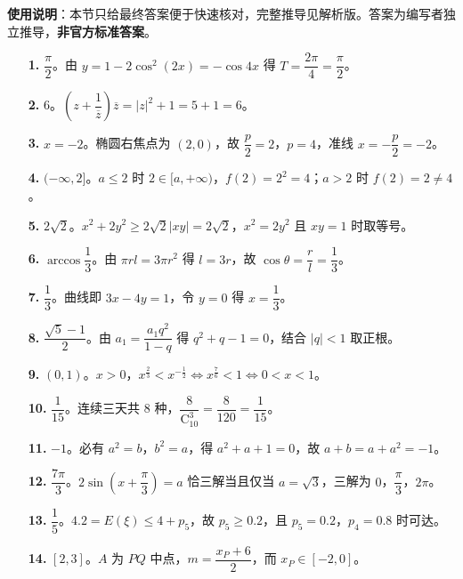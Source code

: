 
\begin{gknotice}
\textbf{使用说明}：本节只给最终答案便于快速核对，完整推导见解析版。答案为编写者独立推导，\textbf{非官方标准答案}。
\end{gknotice}

\begin{itemize}[leftmargin=2.6em]
  \item[\textbf{1.}] $\dfrac\pi2$。由 $y=1-2\cos^2(2x)=-\cos4x$ 得 $T=\dfrac{2\pi}4=\dfrac\pi2$。
  \item[\textbf{2.}] $6$。$\left(z+\dfrac1{\overline z}\right)\overline z=|z|^2+1=5+1=6$。
  \item[\textbf{3.}] $x=-2$。椭圆右焦点为 $(2,0)$，故 $\dfrac p2=2$，$p=4$，准线 $x=-\dfrac p2=-2$。
  \item[\textbf{4.}] $(-\infty,2]$。$a\leqslant2$ 时 $2\in[a,+\infty)$，$f(2)=2^2=4$；$a>2$ 时 $f(2)=2\neq4$。
  \item[\textbf{5.}] $2\sqrt2$。$x^2+2y^2\geqslant2\sqrt2|xy|=2\sqrt2$，$x^2=2y^2$ 且 $xy=1$ 时取等号。
  \item[\textbf{6.}] $\arccos\dfrac13$。由 $\pi rl=3\pi r^2$ 得 $l=3r$，故 $\cos\theta=\dfrac rl=\dfrac13$。
  \item[\textbf{7.}] $\dfrac13$。曲线即 $3x-4y=1$，令 $y=0$ 得 $x=\dfrac13$。
  \item[\textbf{8.}] $\dfrac{\sqrt5-1}{2}$。由 $a_1=\dfrac{a_1q^2}{1-q}$ 得 $q^2+q-1=0$，结合 $|q|<1$ 取正根。
  \item[\textbf{9.}] $(0,1)$。$x>0$，$x^{\frac23}<x^{-\frac12}\iff x^{\frac76}<1\iff0<x<1$。
  \item[\textbf{10.}] $\dfrac1{15}$。连续三天共 $8$ 种，$\dfrac8{\mathrm C_{10}^3}=\dfrac8{120}=\dfrac1{15}$。
  \item[\textbf{11.}] $-1$。必有 $a^2=b$，$b^2=a$，得 $a^2+a+1=0$，故 $a+b=a+a^2=-1$。
  \item[\textbf{12.}] $\dfrac{7\pi}3$。$2\sin\left(x+\dfrac\pi3\right)=a$ 恰三解当且仅当 $a=\sqrt3$，三解为 $0$，$\dfrac\pi3$，$2\pi$。
  \item[\textbf{13.}] $\dfrac15$。$4.2=E(\xi)\leqslant4+p_5$，故 $p_5\geqslant0.2$，且 $p_5=0.2$，$p_4=0.8$ 时可达。
  \item[\textbf{14.}] $[2,3]$。$A$ 为 $PQ$ 中点，$m=\dfrac{x_P+6}2$，而 $x_P\in[-2,0]$。
\end{itemize}


